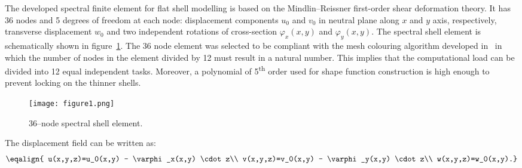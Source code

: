 \documentclass[12pt]{iopart}
\begin{document}
The developed spectral finite element for flat shell modelling is based on the Mindlin--Reissner first-order shear deformation theory. It has 36 nodes and 5 degrees of freedom at each node: displacement components \(u_0\) and \(v_0\) in neutral plane along \(x\) and \(y\) axis, respectively, transverse displacement \(w_0\) and two independent rotations of cross-section \(\varphi_x(x,y)\) and \(\varphi_y(x,y)\). The spectral shell element is schematically shown in figure~\ref{fig:spectral_shell_element}. The 36 node element was selected to be compliant with the mesh colouring algorithm developed in~\cite{Kudela2016} in which the number of nodes in the element divided by 12 must result in a natural number. This implies that the computational load can be divided into 12 equal independent tasks. Moreover, a polynomial of 5\textsuperscript{th} order used for shape function construction is high enough to prevent locking on the thinner shells.
\begin{figure} [h!]
	\centering
	\texttt{[image: figure1.png]}	
	\caption{36--node spectral shell element.}
	\label{fig:spectral_shell_element}
\end{figure}

The displacement field can be written as:
\begin{equation}
\eqalign{
u(x,y,z)=u_0(x,y) - \varphi_x(x,y) \cdot z\\
v(x,y,z)=v_0(x,y) - \varphi_y(x,y) \cdot z\\
w(x,y,z)=w_0(x,y).}
 \label{eq:delam_platedispl}
\end{equation}
\end{document}
